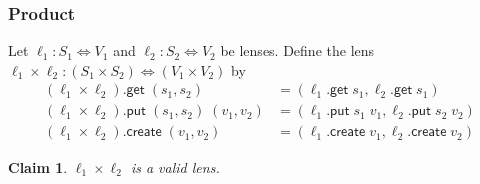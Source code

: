 \documentclass[acmsmall,review,anonymous]{acmart}\settopmatter{printfolios=true,printccs=false,printacmref=false}
\newtheorem{claim}{Claim}
\newcommand{\kw}[1]{\ensuremath{\mathsf{#1}}}
\newcommand{\get}{\ensuremath{\kw{get}}}
\newcommand{\pput}{\ensuremath{\kw{put}}}
\newcommand{\create}{\ensuremath{\kw{create}}}
\begin{document}
\subsubsection{Product}
Let $\ell_1 : S_1 \Leftrightarrow V_1$ and $\ell_2 : S_2 \Leftrightarrow V_2$ be
lenses. Define the lens $\ell_1 \times \ell_2 : (S_1 \times S_2) \Leftrightarrow
(V_1 \times V_2)$ by
\begin{align*}
(\ell_1 \times \ell_2).\get \; (s_1, s_2) &= (\ell_1.\get \; s_1, \ell_2.\get
\; s_1)\\
(\ell_1 \times \ell_2).\pput \; (s_1, s_2) \; (v_1, v_2) &= (\ell_1.\pput \; s_1
\; v_1, \ell_2.\pput \; s_2 \; v_2)\\
(\ell_1 \times \ell_2).\create \; (v_1, v_2) &= (\ell_1.\create \; v_1,
\ell_2.\create \; v_2)
\end{align*}
\begin{claim}
$\ell_1 \times \ell_2$ is a valid lens.
\end{claim}
\end{document}
